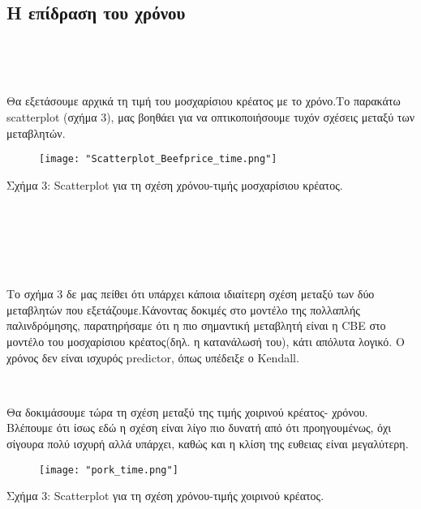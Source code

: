 \documentclass[10pt]{article}
\begin{document}
\subsection{ Η επίδραση του χρόνου}

\

\


Θα εξετάσουμε αρχικά τη τιμή του μοσχαρίσιου κρέατος με το χρόνο.Το παρακάτω scatterplot (σχήμα 3), μας βοηθάει για να οπτικοποιήσουμε τυχόν σχέσεις μεταξύ των μεταβλητών.


\begin{figure}[H]
    \centering
    \texttt{[image: "Scatterplot\_Beefprice\_time.png"]}
    
    \label{fig:galaxy}
\end{figure}

\begin{centering}

\renewcommand{\caption}{Σχήμα 3: }
\caption { Scatterplot για τη σχέση χρόνου-τιμής μοσχαρίσιου κρέατος. }
\end{centering}
\

\

\


Το σχήμα 3 δε μας πείθει ότι υπάρχει κάποια ιδιαίτερη σχέση μεταξύ των δύο μεταβλητών που εξετάζουμε.Κάνοντας δοκιμές στο μοντέλο της πολλαπλής παλινδρόμησης, παρατηρήσαμε ότι η πιο σημαντική μεταβλητή είναι η CBE στο μοντέλο του μοσχαρίσιου κρέατος(δηλ. η κατανάλωσή του), κάτι απόλυτα λογικό. Ο χρόνος δεν είναι ισχυρός predictor, όπως υπέδειξε ο Kendall. 

\






Θα δοκιμάσουμε τώρα τη σχέση μεταξύ της τιμής χοιρινού κρέατος- χρόνου.
Βλέπουμε ότι ίσως εδώ η σχέση είναι λίγο πιο δυνατή από ότι προηγουμένως, όχι σίγουρα πολύ ισχυρή αλλά υπάρχει, καθώς και η κλίση της ευθειας είναι μεγαλύτερη.
 
 
\begin{figure}[H]
    \centering
    \texttt{[image: "pork\_time.png"]}
    
    \label{fig:galaxy}
\end{figure}

\begin{centering}

\renewcommand{\caption}{Σχήμα 3: }
\caption { Scatterplot για τη σχέση χρόνου-τιμής χοιρινού κρέατος. }
\end{centering}
\end{document}

